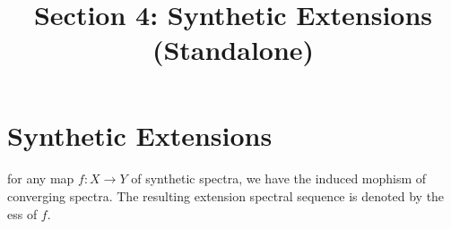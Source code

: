 \documentclass[12pt]{amsart}
\title{Section 4: Synthetic Extensions (Standalone)}
\author{}
\date{}
\numberwithin{equation}{section}
\newcommand{\ESS}[1]{\prescript{#1\!}{}{E}}
\newcommand{\ZESS}[1]{\prescript{#1\!}{}{Z}}
\newcommand{\BESS}[1]{\prescript{#1\!}{}{B}}
\newcommand{\HF}{\mathrm{H}\bF_2}
\newcommand{\phantomlabels}{%
    \label{sec:e6be737c}%
    \label{nota:6fb333a2}%
    \label{prop:30e8b746}%
    \label{cor:aed3d1a4}%
    \label{cor:166dc180}%
    \label{cor:290d35ce}%
    \label{prop:59f111f}%
    \label{exam:synEinfty}%
}
\begin{document}
\maketitle

\phantomlabels

\section{Synthetic Extensions} \label{sec:synext}

\paragraph{}for any map $f:X\rightarrow Y$ of synthetic spectra, we have the induced mophism of converging spectra. The resulting extension spectral sequence is denoted by the ess of $f$.
\end{document}
